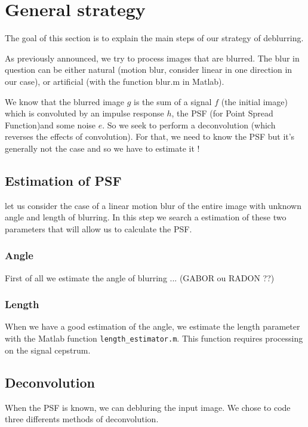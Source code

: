 

\chapter{General strategy}

The goal of this section is to explain the main steps of our strategy of deblurring.

As previously announced, we try to process images that are blurred. The blur in question can be either natural (motion blur, consider linear in one direction in our case), or artificial (with the function blur.m in Matlab).

We know that the blurred image $g$ is the sum of a signal $f$ (the initial image) which is convoluted by an impulse response $h$, the PSF (for Point Spread Function)and some noise $e$. So we seek to perform a deconvolution (which reverses the effects of convolution). For that, we need to know the PSF but it's generally not the case and so we have to estimate it ! 
  
\section{Estimation of PSF}

let us consider the case of a linear motion blur of the entire image with unknown angle and length of blurring. In this step we search a estimation of these two parameters that will allow us to calculate the PSF. 
\subsection{Angle}
First of all we estimate the angle of blurring ... (GABOR ou RADON ??)

\subsection{Length}
When we have a good estimation of the angle, we estimate the length parameter with the Matlab function \verb|length_estimator.m|. This function requires processing on the signal cepstrum. 

\section{Deconvolution}

When the PSF is known, we can debluring the input image. We chose to code three differents methods of deconvolution.

